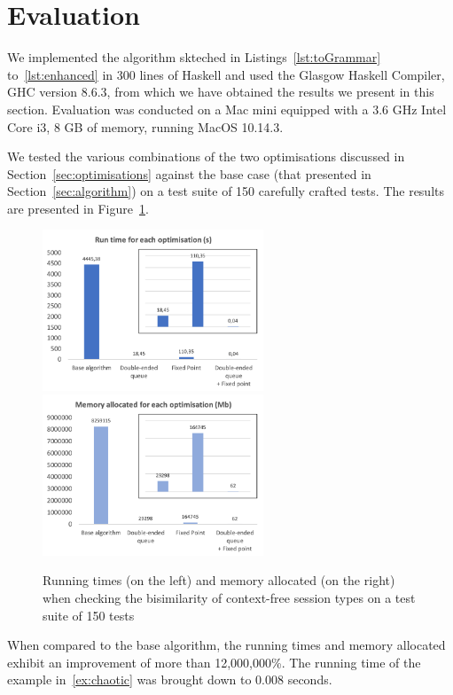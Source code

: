 \section{Evaluation}
\label{sec:evaluation}


We implemented the algorithm skteched in Listings~\ref{lst:toGrammar}
to~\ref{lst:enhanced} in 300 lines of Haskell and used the Glasgow
Haskell Compiler, GHC version 8.6.3, from which we have obtained the
results we present in this section.  Evaluation was conducted on a Mac
mini equipped with a 3.6 GHz Intel Core i3, 8 GB of memory, running
MacOS 10.14.3.

We tested the various combinations of the two optimisations discussed
in Section~\ref{sec:optimisations} against the base case (that
presented in Section~\ref{sec:algorithm}) on a test suite of 150
carefully crafted tests. The results are presented in
Figure~\ref{fig:results}.

\begin{figure}[h]
  \includegraphics[height=4.8cm]{img/run_time}
  \quad 
  \includegraphics[height=4.8cm]{img/memory_alloc}	
  \caption{Running times (on the left) and memory allocated (on the
    right) when checking the bisimilarity of context-free session
    types on a test suite of 150 tests}
  \label{fig:results}
\end{figure}

When compared to the base algorithm, the running times and memory
allocated exhibit an improvement of more than 12,000,000\%. The
running time of the example in~\eqref{ex:chaotic} was brought down to
0.008 seconds.


